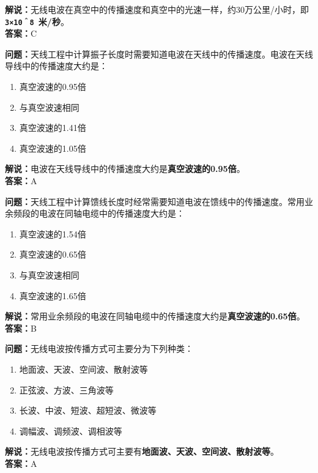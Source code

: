 \documentclass{ctexbook}
\begin{document}
\noindent\textbf{解说：}无线电波在真空中的传播速度和真空中的光速一样，约30万公里/小时，即\textbf{\texttt{3×10＾8 }米/秒}。\\\noindent\textbf{答案：}C


\bigskip


\noindent\textbf{问题：}天线工程中计算振子长度时需要知道电波在天线中的传播速度。电波在天线导线中的传播速度大约是：

\begin{enumerate}[label=\Alph*), leftmargin=3em]
	\item 真空波速的0.95倍
	\item 与真空波速相同
	\item 真空波速的1.41倍
	\item 真空波速的1.05倍
\end{enumerate}

\noindent\textbf{解说：}电波在天线导线中的传播速度大约是\textbf{真空波速的0.95倍}。\\\noindent\textbf{答案：}A


\bigskip


\noindent\textbf{问题：}天线工程中计算馈线长度时经常需要知道电波在馈线中的传播速度。常用业余频段的电波在同轴电缆中的传播速度大约是：

\begin{enumerate}[label=\Alph*), leftmargin=3em]
	\item 真空波速的1.54倍
	\item 真空波速的0.65倍
	\item 与真空波速相同
	\item 真空波速的1.65倍
\end{enumerate}

\noindent\textbf{解说：}常用业余频段的电波在同轴电缆中的传播速度大约是\textbf{真空波速的0.65倍}。\\\noindent\textbf{答案：}B


\bigskip


\noindent\textbf{问题：}无线电波按传播方式可主要分为下列种类：

\begin{enumerate}[label=\Alph*), leftmargin=3em]
	\item 地面波、天波、空间波、散射波等
	\item 正弦波、方波、三角波等
	\item 长波、中波、短波、超短波、微波等
	\item 调幅波、调频波、调相波等
\end{enumerate}

\noindent\textbf{解说：}无线电波按传播方式可主要有\textbf{地面波、天波、空间波、散射波等}。\\\noindent\textbf{答案：}A
\end{document}
